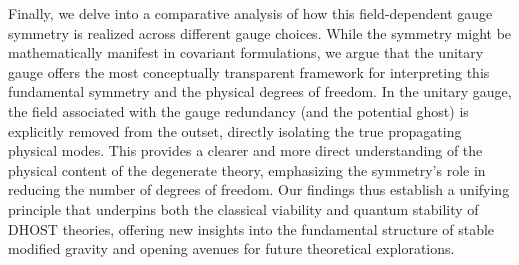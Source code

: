\documentclass[twocolumn]{aastex631}
\begin{document}
Finally, we delve into a comparative analysis of how this field-dependent gauge symmetry is realized across different gauge choices. While the symmetry might be mathematically manifest in covariant formulations, we argue that the unitary gauge offers the most conceptually transparent framework for interpreting this fundamental symmetry and the physical degrees of freedom. In the unitary gauge, the field associated with the gauge redundancy (and the potential ghost) is explicitly removed from the outset, directly isolating the true propagating physical modes. This provides a clearer and more direct understanding of the physical content of the degenerate theory, emphasizing the symmetry's role in reducing the number of degrees of freedom. Our findings thus establish a unifying principle that underpins both the classical viability and quantum stability of DHOST theories, offering new insights into the fundamental structure of stable modified gravity and opening avenues for future theoretical explorations.
\end{document}
